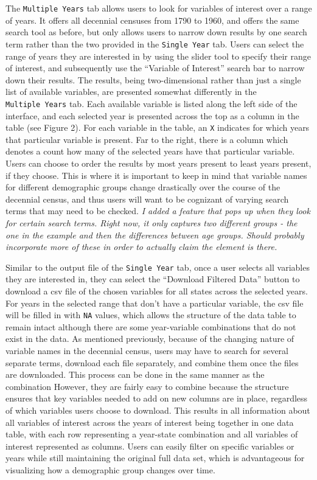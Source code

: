 \documentclass[11pt,]{article}
\begin{document}
The \texttt{Multiple\ Years} tab allows users to look for variables of
interest over a range of years. It offers all decennial censuses from
1790 to 1960, and offers the same search tool as before, but only allows
users to narrow down results by one search term rather than the two
provided in the \texttt{Single\ Year} tab. Users can select the range of
years they are interested in by using the slider tool to specify their
range of interest, and subsequently use the ``Variable of Interest''
search bar to narrow down their results. The results, being
two-dimensional rather than just a single list of available variables,
are presented somewhat differently in the \texttt{Multiple\ Years} tab.
Each available variable is listed along the left side of the interface,
and each selected year is presented across the top as a column in the
table (see Figure 2). For each variable in the table, an \texttt{X}
indicates for which years that particular variable is present. Far to
the right, there is a column which denotes a count how many of the
selected years have that particular variable. Users can choose to order
the results by most years present to least years present, if they
choose. This is where it is important to keep in mind that variable
names for different demographic groups change drastically over the
course of the decennial census, and thus users will want to be cognizant
of varying search terms that may need to be checked. \emph{I added a
feature that pops up when they look for certain search terms. Right now,
it only captures two different groups - the one in the example and then
the differences between age groups. Should probably incorporate more of
these in order to actually claim the element is there.}

Similar to the output file of the \texttt{Single\ Year} tab, once a user
selects all variables they are interested in, they can select the
``Download Filtered Data'' button to download a csv file of the chosen
variables for all states across the selected years. For years in the
selected range that don't have a particular variable, the csv file will
be filled in with \texttt{NA} values, which allows the structure of the
data table to remain intact although there are some year-variable
combinations that do not exist in the data. As mentioned previously,
because of the changing nature of variable names in the decennial
census, users may have to search for several separate terms, download
each file separately, and combine them once the files are downloaded.
This process can be done in the same manner as the combination However,
they are fairly easy to combine because the structure ensures that key
variables needed to add on new columns are in place, regardless of which
variables users choose to download. This results in all information
about all variables of interest across the years of interest being
together in one data table, with each row representing a year-state
combination and all variables of interest represented as columns. Users
can easily filter on specific variables or years while still maintaining
the original full data set, which is advantageous for visualizing how a
demographic group changes over time.
\end{document}
